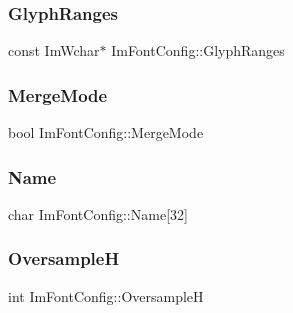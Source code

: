 \hypertarget{struct_im_font_config_aa174ceff80323012cd1b717d864258dd}{}\label{struct_im_font_config_aa174ceff80323012cd1b717d864258dd} 
\subsubsection{\texorpdfstring{Glyph\+Ranges}{GlyphRanges}}
{\footnotesize\ttfamily const Im\+Wchar$\ast$ Im\+Font\+Config\+::\+Glyph\+Ranges}

\hypertarget{struct_im_font_config_ad5cab281622e5bdec8e2d55cadc5601e}{}\label{struct_im_font_config_ad5cab281622e5bdec8e2d55cadc5601e} 
\subsubsection{\texorpdfstring{Merge\+Mode}{MergeMode}}
{\footnotesize\ttfamily bool Im\+Font\+Config\+::\+Merge\+Mode}

\hypertarget{struct_im_font_config_abcd5db10139b42fbac90e31512c64f08}{}\label{struct_im_font_config_abcd5db10139b42fbac90e31512c64f08} 
\subsubsection{\texorpdfstring{Name}{Name}}
{\footnotesize\ttfamily char Im\+Font\+Config\+::\+Name\mbox{[}32\mbox{]}}

\hypertarget{struct_im_font_config_ab460df0d8019ffa8d124e8988c710910}{}\label{struct_im_font_config_ab460df0d8019ffa8d124e8988c710910} 
\subsubsection{\texorpdfstring{OversampleH}{OversampleH}}
{\footnotesize\ttfamily int Im\+Font\+Config\+::\+OversampleH}

\hypertarget{struct_im_font_config_a8018f84c60bfafb2b4629aeb77a047cb}{}\label{struct_im_font_config_a8018f84c60bfafb2b4629aeb77a047cb} 
